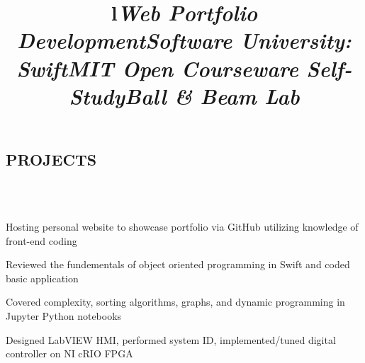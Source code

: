 \documentclass[mm]{res}
\begin{document}
\begin{resume}
\toprule
\section{\faPencilSquareO \xspace PROJECTS \xspace}
\begin{format}
\title{l}\\
\body\\
\end{format}

\title{\textsl{Web Portfolio Development}}
\begin{position}
\tb Hosting personal website to showcase portfolio via GitHub utilizing knowledge of front-end coding
\end{position}

\title{\textsl{Software University: Swift}}
\begin{position}
\tb Reviewed the fundementals of object oriented programming in Swift and coded basic application
\end{position}


\title{\textsl{MIT Open Courseware Self-Study}}
\begin{position}
\tb Covered complexity, sorting algorithms, graphs, and dynamic programming in Jupyter Python notebooks
\end{position}

\title{\textsl{Ball \& Beam Lab}}
\begin{position}
\tb Designed LabVIEW HMI, performed system ID, implemented/tuned digital controller on NI cRIO FPGA
\end{position}



\end{resume}
\end{document}
